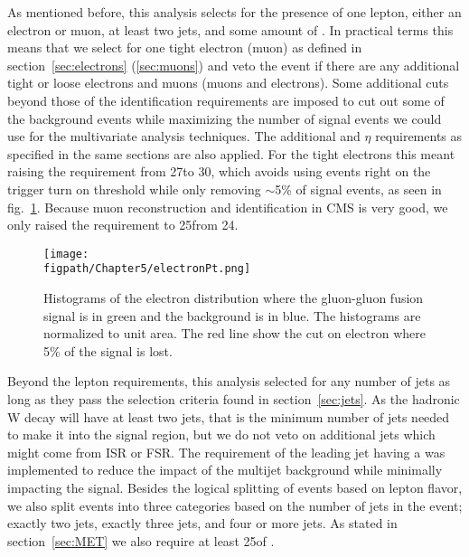 As mentioned before, this analysis selects for the presence of one lepton, either an electron or muon, at least two jets, and some amount of \VETslash.
In practical terms this means that we select for one tight electron (muon) as defined in section~\ref{sec:electrons} (\ref{sec:muons}) and veto the event if there are any additional tight or loose electrons and muons (muons and electrons).
Some additional cuts beyond those of the identification requirements are imposed to cut out some of the background events while maximizing the number of signal events we could use for the multivariate analysis techniques.
The additional \pt and $\eta$ requirements as specified in the same sections are also applied.
For the tight electrons this meant raising the \pt requirement from 27\gev to 30\gev, which avoids using events right on the trigger turn on threshold while only removing $\sim$5\% of signal events, as seen in fig.~\ref{fig:electronPt_signal_loss}. 
Because muon reconstruction and identification in CMS is very good, we only raised the \pt requirement to 25\gev from 24\gev.

\begin{figure}[!hbt]
    \centering
    \texttt{[image: \\figpath/Chapter5/electronPt.png]}
    \caption{Histograms of the electron \pt distribution where the gluon-gluon fusion signal is in green and the \Wjets background is in blue. The histograms are normalized to unit area. The red line show the cut on electron \pt where 5\% of the signal is lost.}
    \label{fig:electronPt_signal_loss}
\end{figure}

Beyond the lepton requirements, this analysis selected for any number of jets as long as they pass the selection criteria found in section~\ref{sec:jets}.
As the hadronic W decay will have at least two jets, that is the minimum number of jets needed to make it into the signal region, but we do not veto on additional jets which might come from ISR or FSR.
The requirement of the leading jet having a \gev was implemented to reduce the impact of the multijet background while minimally impacting the signal.
Besides the logical splitting of events based on lepton flavor, we also split events into three categories based on the number of jets in the event; exactly two jets, exactly three jets, and four or more jets.
As stated in section~\ref{sec:MET} we also require at least 25\gev of \VETslash.

